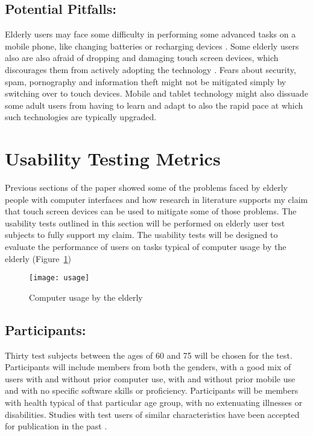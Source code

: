 \documentclass[12pt,draftcls,onecolumn]{IEEEtran}
\begin{document}
\subsection{Potential Pitfalls:}
Elderly users may face some difficulty in performing some advanced tasks on a mobile phone, like changing batteries or recharging devices \cite{haikio2007touch}. Some elderly users also are also afraid of dropping and damaging touch screen devices, which discourages them from actively adopting the technology \cite{holzinger2007some}. Fears about security, spam, pornography and information theft might not be mitigated simply by switching over to touch devices. Mobile and tablet technology might also dissuade some adult users from having to learn and adapt to also the rapid pace at which such technologies are typically upgraded. 

\section{Usability Testing Metrics}

Previous sections of the paper showed some of the problems faced by elderly people with computer interfaces and how research in literature supports my claim that touch screen devices can be used to mitigate some of those problems. The usability tests outlined in this section will be performed on elderly user test subjects to fully support my claim. The usability tests will be designed to evaluate the performance of users on tasks typical of computer usage by the elderly \cite{white1999surfing} (Figure~\ref{usage})  

 \begin{figure}[!h]
\centering
\texttt{[image: usage]}
\caption{Computer usage by the elderly}
\label{usage}
\end{figure}

\subsection{Participants:}
Thirty test subjects between the ages of 60 and 75 will be chosen for the test. Participants will include members from both the genders, with a good mix of users with and without prior computer use, with and without prior mobile use and with no specific software skills or proficiency. Participants will be members with health typical of that particular age group, with no extenuating illnesses or disabilities. Studies with test users of similar characteristics have been accepted for publication in the past \cite{kobayashi2011elderly}.
\end{document}
